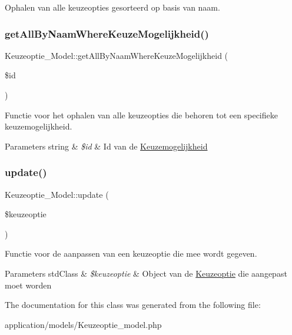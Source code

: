 Ophalen van alle keuzeopties gesorteerd op basis van naam. \mbox{\label{class_keuzeoptie___model_af29156c45eb0464a373c6e908982be59}} 
\subsubsection{\texorpdfstring{get\+All\+By\+Naam\+Where\+Keuze\+Mogelijkheid()}{getAllByNaamWhereKeuzeMogelijkheid()}}
{\footnotesize\ttfamily Keuzeoptie\+\_\+\+Model\+::get\+All\+By\+Naam\+Where\+Keuze\+Mogelijkheid (\begin{DoxyParamCaption}\item[{}]{\$id }\end{DoxyParamCaption})}

Functie voor het ophalen van alle keuzeopties die behoren tot een specifieke keuzemogelijkheid. 
\begin{DoxyParams}[1]{Parameters}
string & {\em \$id} & Id van de \mbox{\hyperlink{class_keuzemogelijkheid}{Keuzemogelijkheid}} \\
\hline
\end{DoxyParams}
\mbox{\label{class_keuzeoptie___model_abe363a388f68ec737b0957b748f012d8}} 
\subsubsection{\texorpdfstring{update()}{update()}}
{\footnotesize\ttfamily Keuzeoptie\+\_\+\+Model\+::update (\begin{DoxyParamCaption}\item[{}]{\$keuzeoptie }\end{DoxyParamCaption})}

Functie voor de aanpassen van een keuzeoptie die mee wordt gegeven. 
\begin{DoxyParams}[1]{Parameters}
std\+Class & {\em \$keuzeoptie} & Object van de \mbox{\hyperlink{class_keuzeoptie}{Keuzeoptie}} die aangepast moet worden \\
\hline
\end{DoxyParams}


The documentation for this class was generated from the following file\+:\begin{DoxyCompactItemize}
\item 
application/models/Keuzeoptie\+\_\+model.\+php\end{DoxyCompactItemize}
